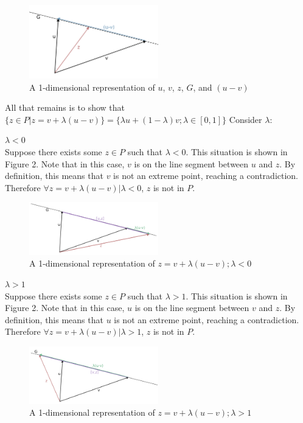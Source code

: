 \documentclass[11pt]{article}
\begin{document}
\begin{figure}[h]
\includegraphics[width=0.5\textwidth]{4b-general}
\centering
\caption{A 1-dimensional representation of $u$, $v$, $z$, $G$, and $(u-v)$}
\end{figure}

All that remains is to show that $\{z\in P|z=v+\lambda(u-v)\}=\{\lambda u + (1-\lambda) v; \lambda\in[0,1]\}$ Consider $\lambda$:

\underline{$\lambda < 0$} \\

Suppose there exists some $z\in P$ such that $\lambda < 0$. This situation is shown in Figure 2. Note that in this case, $v$ is on the line segment between $u$ and $z$. By definition, this means that $v$ is not an extreme point, reaching a contradiction. Therefore $\forall z=v+\lambda(u-v)|\lambda<0$, $z$ is not in $P$.

\begin{figure}[h]
\includegraphics[width=0.5\textwidth]{4b-negative}
\centering
\caption{A 1-dimensional representation of $z=v+\lambda(u-v); \lambda<0$}
\end{figure}

\underline{$\lambda > 1$} \\

Suppose there exists some $z\in P$ such that $\lambda > 1$. This situation is shown in Figure 2. Note that in this case, $u$ is on the line segment between $v$ and $z$. By definition, this means that $u$ is not an extreme point, reaching a contradiction. Therefore $\forall z=v+\lambda(u-v)|\lambda>1$, $z$ is not in $P$.

\begin{figure}[h]
\includegraphics[width=0.5\textwidth]{4b-positive}
\centering
\caption{A 1-dimensional representation of $z=v+\lambda(u-v); \lambda>1$}
\end{figure}
\end{document}
